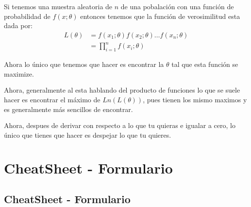 \documentclass[12pt, fleqn]{report}                             %
\theoremstyle{break}                                            %
\begin{document}
            Si tenemos una muestra aleatoria de $n$ de una pobalación con una función
            de probabilidad de $f(x; \theta)$ entonces tenemos que la función
            de verosimilitud esta dada por:
            \begin{align*}
                L(\theta) 
                    &= f(x_1; \theta) f(x_2; \theta) \dots f(x_n; \theta)       \\
                    &= \prod_{i = 1}^n f(x_i; \theta)
            \end{align*}

            Ahora lo único que tenemos que hacer es encontrar la $\theta$
            tal que esta función se maximize.

            Ahora, generalmente al esta hablando del producto de funciones lo
            que se suele hacer es encontrar el máximo de $Ln(L(\theta))$, 
            pues tienen los mismo maximos y es generalmente más sencillos de encontrar.

            Ahora, despues de derivar con respecto a lo que tu quieras e igualar a cero, lo 
            único que tienes que hacer es despejar lo que tu quieres.






\part{CheatSheet - Formulario}
\clearpage


    \chapter{CheatSheet - Formulario}


        \clearpage
\end{document}
